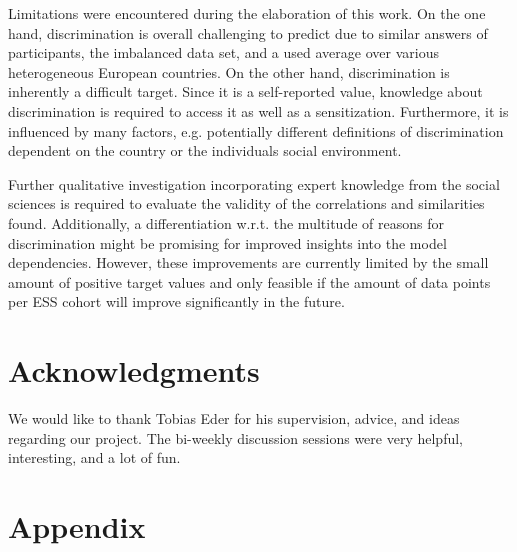\documentclass[10pt]{article}
\begin{document}
	Limitations were encountered during the elaboration of this work. On the one hand, discrimination is overall challenging to predict due to similar answers of participants, the imbalanced data set, and a used average over various heterogeneous European countries. On the other hand, discrimination is inherently a difficult target. Since it is a self-reported value, knowledge about discrimination is required to access it as well as a sensitization. Furthermore, it is influenced by many factors, e.g. potentially different definitions of discrimination dependent on the country or the individuals social environment.
	
	Further qualitative investigation incorporating expert knowledge from the social sciences is required to evaluate the validity of the correlations and similarities found. Additionally, a differentiation w.r.t. the multitude of reasons for discrimination might be promising for improved insights into the model dependencies. However, these improvements are currently limited by the small amount of positive target values and only feasible if the amount of data points per ESS cohort will improve significantly in the future. 
	

	
	\section*{Acknowledgments}
	We would like to thank Tobias Eder for his supervision, advice, and ideas regarding our project. The bi-weekly discussion sessions were very helpful, interesting, and a lot of fun.
	
	
	
	
	
	
	\appendix
	\section{Appendix} \label{sec:appendix}
	
\end{document}
